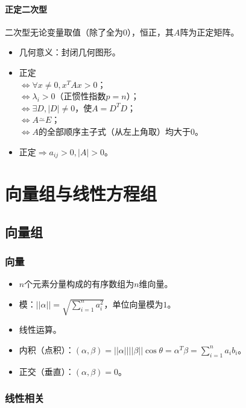 \documentclass[
12pt, %
a4paper, 
oneside, %
headinclude,footinclude, %
]{scrartcl}
\begin{document}
\paragraph{正定二次型}
二次型无论变量取值（除了全为$ 0 $），恒正，其$ A $阵为正定矩阵。
\begin{itemize}
\item 几何意义：封闭几何图形。
\item {}正定 \\
$ \Leftrightarrow $$ \forall x \neq 0, x^TAx > 0 $； \\
$ \Leftrightarrow $$ \lambda_i > 0 $（正惯性指数$ p = n $）； \\
$ \Leftrightarrow $$ \exists D, |D| \neq 0 $，使$ A = D^TD $； \\
$ \Leftrightarrow $$ A \overset{\sim}{-} E $； \\
$ \Leftrightarrow $$ A $的全部顺序主子式（从左上角取）均大于$ 0 $。
\item 正定$ \Rightarrow $$ a_{ij} > 0, |A| > 0 $。
\end{itemize}
\section{向量组与线性方程组}
\subsection{向量组}
\subsubsection{向量}
\begin{itemize}
\item $ n $个元素分量构成的有序数组为$ n $维向量。
\item 模：$ ||\alpha|| = \sqrt{\sum_{i = 1}^n a_i^2} $，单位向量模为$ 1 $。
\item 线性运算。
\item 内积（点积）：$ (\alpha, \beta) = ||\alpha||||\beta|| \cos\theta = \alpha^T\beta = \sum_{i = 1}^n a_i b_i $。
\item 正交（垂直）：$ (\alpha, \beta) = 0 $。
\end{itemize}
\subsubsection{线性相关}
\end{document}

